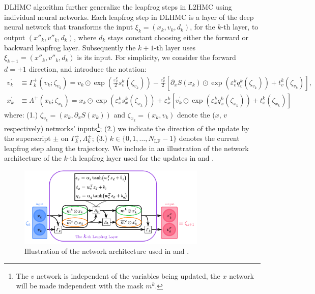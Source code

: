 \documentclass{article} %
\begin{document}
DLHMC algorithm further generalize the leapfrog steps in L2HMC using individual neural networks.
Each leapfrog step in DLHMC is a layer of the deep neural network that transforms the input $\xi_k=(x_k,v_k,d_k)$, for the $k$-th layer,
to output $(x''_k,v''_k,d_k)$, where $d_k$ stays constant choosing either the forward or backward leapfrog layer.
Subsequently the $k+1$-th layer uses $\xi_{k+1}=(x''_k,v''_k,d_k)$ is its input.
For simplicity, we consider the forward \(d=+1\) direction, and introduce the notation:
%
\begin{align}
   v^{\prime}_{k} &\equiv \Gamma^{+}_{k}(v_{k};\zeta_{v_{k}})
   = v_{k}\odot \exp{\left(\tfrac{\varepsilon^{k}_{v}}{2}s_{v}^{k}(\zeta_{v_{k}})\right)} -
   \tfrac{\varepsilon^{k}_{v}}{2}{\left[\partial_{x}S(x_{k})\odot\exp{\left(\varepsilon^{k}_{v} q_{v}^{k}(\zeta_{v_{k}})\right)}
      +t_{v}^{k}(\zeta_{v_{k}})\right]},\label{eq:new_momentum_update}\\
   x^{\prime}_{k} &\equiv \Lambda^{+}(x_{k};\zeta_{x_{k}})
   = x_{k}\odot\exp(\varepsilon^{k}_{x} s^{k}_{x}(\zeta_{x_{k}}))
   + \varepsilon^{k}_{x}\left[v^{\prime}_{k}\odot\exp(\varepsilon^{k}_{x} q^{k}_{x}(\zeta_{x_{k}}))
         + t^{k}_{x}(\zeta_{x_{k}})\right]\label{eq:new_position_update}
\end{align}
%
where: (1.) \(\zeta_{v_{k}} = (x_{k}, \partial_{x}S(x_{k}))\) and \(\zeta_{x_{k}} = (x_{k}, v_{k})\) denote the (\(x\),
\(v\) respectively) networks' inputs\footnote{%
 The $v$ network is independent of the variables being updated,
 the $x$ network will be made independent with the mask $m^k$.};
  (2.) we indicate the direction of the update by the superscript \(\pm\) on \(\Gamma^{\pm}_{k},
\Lambda^{\pm}_{k}\); (3.) \(k\in\{0,1,\ldots,N_{\mathrm{LF}}-1\}\) denotes the current leapfrog step along the trajectory.
%
We include in  an illustration of the network architecture of the $k$-th leapfrog layer
used for the updates in  and .
%
\begin{figure}[htpb]
   \centering
   \includegraphics[width=0.8\textwidth]{figures/network12.pdf}
   \caption{\label{fig:network}Illustration of the network architecture used in  and .}
\end{figure}
\end{document}
